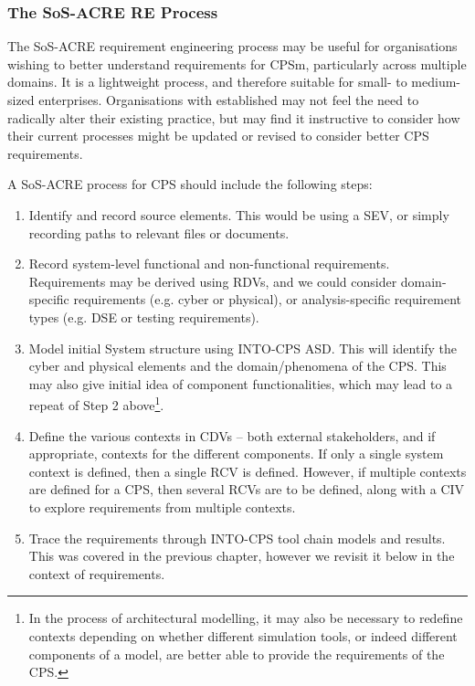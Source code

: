 \subsubsection{The SoS-ACRE RE Process}

The SoS-ACRE requirement engineering process may be useful for organisations wishing to better understand requirements for CPSm, particularly across multiple domains. It is a lightweight process, and therefore suitable for small- to medium-sized enterprises. Organisations with established may not feel the need to radically alter their existing practice, but may find it instructive to consider how their current processes might be updated or revised to consider better CPS requirements.


A SoS-ACRE process for CPS should include the following steps:

\begin{enumerate}
\item Identify and record source elements. This would be using a SEV, or simply recording paths to relevant files or documents.

\item Record system-level functional and non-functional requirements. Requirements may be derived using RDVs, and we could consider domain-specific requirements (e.g. cyber or physical), or analysis-specific requirement types (e.g. DSE or testing requirements).

\item Model initial System structure using INTO-CPS ASD. This will identify the cyber and physical elements and the domain/phenomena of the CPS. This may also give initial idea of component functionalities, which may lead to a repeat of Step 2 above\footnote{In the process of architectural modelling, it may also be necessary to redefine contexts depending on whether different simulation tools, or indeed different components of a model, are better able to provide the requirements of the CPS.}.

\item Define the various contexts in CDVs -- both external stakeholders, and if appropriate, contexts for the different components. If only a single system context is defined, then a single RCV is defined. However, if multiple contexts are defined for a CPS, then several RCVs are to be defined, along with a CIV to explore requirements from multiple contexts.

\item Trace the requirements through INTO-CPS tool chain models and results. This was covered in the previous chapter, however we revisit it below in the context of requirements.
\end{enumerate}

